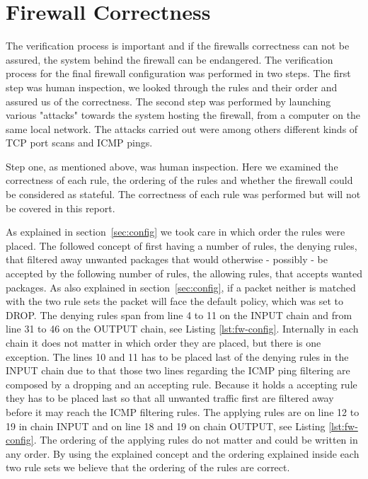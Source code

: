 \section{Firewall Correctness}
\label{sec:correctness}

The verification process is important and if the firewalls correctness can not be assured, the system behind the firewall can be endangered. The verification process for the final firewall configuration was performed in two steps. The first step was human inspection, we looked through the rules and their order and assured us of the correctness. The second step was performed by launching various "attacks" towards the system hosting the firewall, from a computer on the same local network. The attacks carried out were among others different kinds of TCP port scans and ICMP pings.

Step one, as mentioned above, was human inspection. Here we examined the correctness of each rule, the ordering of the rules and whether the firewall could be considered as stateful. The correctness of each rule was performed but will not be covered in this report.  

As explained in section~\ref{sec:config} we took care in which order the rules were placed. The followed concept of first having a number of rules, the denying rules, that filtered away unwanted packages that would otherwise - possibly - be accepted by the following number of rules, the allowing rules, that accepts wanted packages. As also explained in section~\ref{sec:config}, if a packet neither is matched with the two rule sets the packet will face the default policy, which was set to DROP. The denying rules span from line 4 to 11 on the INPUT chain and from line 31 to 46 on the OUTPUT chain, see Listing \ref{lst:fw-config}. Internally in each chain it does not matter in which order they are placed, but there is one exception. The lines 10 and 11 has to be placed last of the denying rules in the INPUT chain due to that those two lines regarding the ICMP ping filtering are composed by a dropping and an accepting rule. Because it holds a accepting rule they has to be placed last so that all unwanted traffic first are filtered away before it may reach the ICMP filtering rules. The applying rules are on line 12 to 19 in chain INPUT and on line 18 and 19 on chain OUTPUT, see Listing \ref{lst:fw-config}. The ordering of the applying rules do not matter and could be written in any order. By using the explained concept and the ordering explained inside each two rule sets we believe that the ordering of the rules are correct.

